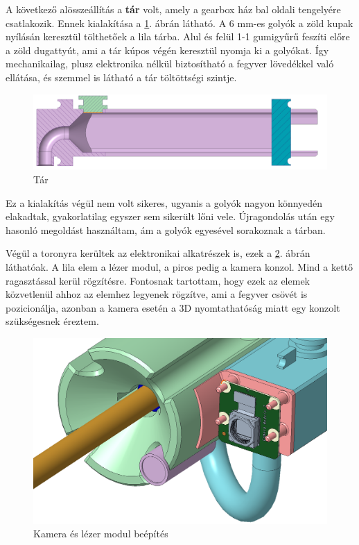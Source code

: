 \documentclass[12pt,a4paper]{article}
\begin{document}
A következő alösszeállítás a \textbf{tár} volt, amely a gearbox ház bal oldali tengelyére csatlakozik. Ennek kialakítása a \ref{fig:mech_tar}. ábrán látható. A 6 mm-es golyók a zöld kupak nyílásán keresztül tölthetőek a lila tárba. Alul és felül 1-1 gumigyűrű feszíti előre a zöld dugattyút, ami a tár kúpos végén keresztül nyomja ki a golyókat. Így mechanikailag, plusz elektronika nélkül biztosítható a fegyver lövedékkel való ellátása, és szemmel is látható a tár töltöttségi szintje.

\begin{figure}[h!]
	\centering
	\includegraphics[width=1\linewidth]{mech_tar}
	\caption{Tár}
	\label{fig:mech_tar}
\end{figure}

Ez a kialakítás végül nem volt sikeres, ugyanis a golyók nagyon könnyedén elakadtak, gyakorlatilag egyszer sem sikerült lőni vele. Újragondolás után egy hasonló megoldást használtam, ám a golyók egyesével sorakoznak a tárban.

Végül a toronyra kerültek az elektronikai alkatrészek is, ezek a \ref{fig:mech_dt4000kamera}. ábrán láthatóak. A lila elem a lézer modul, a piros pedig a kamera konzol. Mind a kettő ragasztással kerül rögzítésre. Fontosnak tartottam, hogy ezek az elemek közvetlenül ahhoz az elemhez legyenek rögzítve, ami a fegyver csövét is pozicionálja, azonban a kamera esetén a 3D nyomtathatóság miatt egy konzolt szükségesnek éreztem.

\begin{figure}[h!]
	\centering
	\includegraphics[width=1\linewidth]{mech_dt4000kamera}
	\caption{Kamera és lézer modul beépítés}
	\label{fig:mech_dt4000kamera}
\end{figure}
\end{document}
